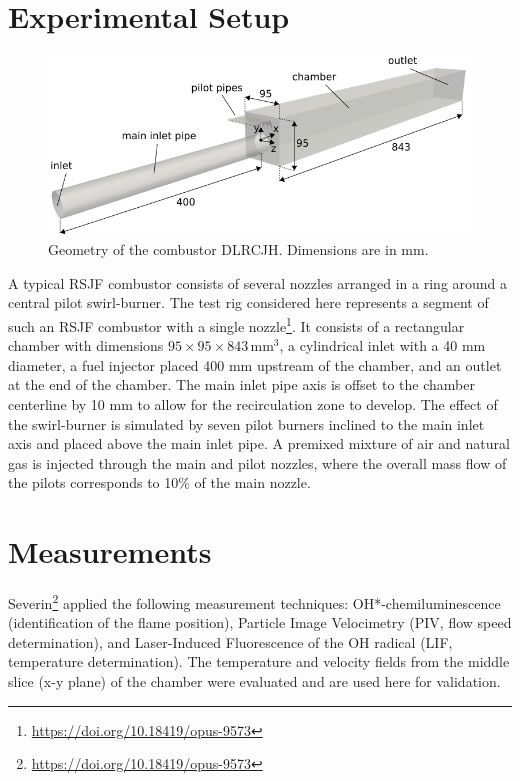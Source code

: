 \section*{Experimental Setup}
\begin{figure}[H]
    \centering
    \includegraphics[width=\textwidth]{figs/DLRCJH/geometry_3D.png}
    \caption{Geometry of the combustor DLRCJH. Dimensions are in mm.}
\end{figure}

A typical RSJF combustor consists of several nozzles arranged in a ring around a central pilot swirl-burner. The test rig considered here represents a segment of such an RSJF combustor with a single nozzle\footnote{\url{https://doi.org/10.18419/opus-9573}}. It consists of a rectangular chamber with dimensions $95 \times 95 \times 843 \, \text{mm}^3$, a cylindrical inlet with a 40 mm diameter, a fuel injector placed 400 mm upstream of the chamber, and an outlet at the end of the chamber. The main inlet pipe axis is offset to the chamber centerline by 10 mm to allow for the recirculation zone to develop. The effect of the swirl-burner is simulated by seven pilot burners inclined to the main inlet axis and placed above the main inlet pipe. A premixed mixture of air and natural gas is injected through the main and pilot nozzles, where the overall mass flow of the pilots corresponds to 10\% of the main nozzle.

\section*{Measurements}
Severin\footnote{\url{https://doi.org/10.18419/opus-9573}} applied the following measurement techniques: OH*-chemiluminescence (identification of the flame position), Particle Image Velocimetry (PIV, flow speed determination), and Laser-Induced Fluorescence of the OH radical (LIF, temperature determination). The temperature and velocity fields from the middle slice (x-y plane) of the chamber were evaluated and are used here for validation.

